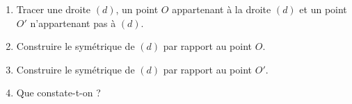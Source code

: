 
\begin{exercice}\label{exosmath-0990}

    \begin{enumerate}
        \item
            Tracer une droite \( (d)\), un point \( O\) appartenant à la droite \( (d)\) et un point \( O'\) n'appartenant pas à \( (d)\).
        \item
            Construire le symétrique de \( (d)\) par rapport au point \( O\).
        \item
            Construire le symétrique de \( (d)\) par rapport au point \( O'\).
        \item
            Que constate-t-on ?
    \end{enumerate}

\end{exercice}
